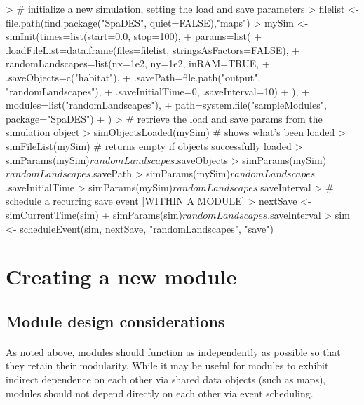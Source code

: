 \documentclass{article}
\begin{document}
\begin{Schunk}
\begin{Sinput}
> # initialize a new simulation, setting the load and save parameters
> filelist <- file.path(find.package("SpaDES", quiet=FALSE),"maps")
> mySim <- simInit(times=list(start=0.0, stop=100),
+                  params=list(
+                    .loadFileList=data.frame(files=filelist, stringsAsFactors=FALSE),
+                    randomLandscapes=list(nx=1e2, ny=1e2, inRAM=TRUE,
+                                 .saveObjects=c("habitat"),
+                                 .savePath=file.path("output", "randomLandscapes"),
+                                 .saveInitialTime=0, .saveInterval=10)
+                    ),
+                  modules=list("randomLandscapes"),
+                  path=system.file("sampleModules", package="SpaDES")
+ )
> # retrieve the load and save params from the simulation object
> simObjectsLoaded(mySim) # shows what's been loaded
> simFileList(mySim) # returns empty if objects successfully loaded
> simParams(mySim)$randomLandscapes$.saveObjects
> simParams(mySim)$randomLandscapes$.savePath
> simParams(mySim)$randomLandscapes$.saveInitialTime
> simParams(mySim)$randomLandscapes$.saveInterval
> # schedule a recurring save event [WITHIN A MODULE]
> nextSave <- simCurrentTime(sim) + simParams(sim)$randomLandscapes$.saveInterval
> sim <- scheduleEvent(sim, nextSave, "randomLandscapes", "save")
\end{Sinput}
\end{Schunk}

\newpage

\section{Creating a new module}

\subsection{Module design considerations}

\paragraph{}
\textit{\color{blue}{perhaps a bit about design phlosophy, relating back to dependencies and how to carefully build modules that actually retain modularity.}}

\paragraph{}
As noted above, modules should function as independently as possible so that they retain their modularity. While it may be useful for modules to exhibit indirect dependence on each other via shared data objects (such as maps), modules should not depend directly on each other via event scheduling.
\end{document}
